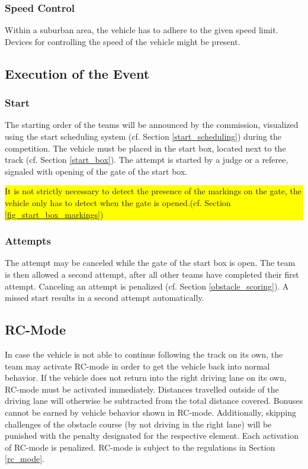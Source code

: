 \documentclass[a4paper]{report}
\newlength\colorboxwidth
\begin{document}
{\subsubsection{Speed Control}

Within a suburban area, the vehicle has to adhere to the given speed limit. Devices for controlling the speed of the vehicle might be present. 

\subsection{Execution of the Event}

\subsubsection{Start}

The starting order of the teams will be announced by the commission, visualized using the start scheduling system (cf. Section \ref{start_scheduling}) during the competition. The vehicle must be placed in the start box, located next to the track (cf. Section \ref{start_box}). The attempt is started by a judge or a referee, signaled with opening of the gate of the start box.\\
{\colorbox{yellow}{\parbox{\colorboxwidth}{It is not strictly necessary to detect the presence of the markings on the gate, the vehicle only has to detect when the gate is opened.(cf. Section \ref{fig_start_box_markings})}}


\subsubsection{Attempts}

The attempt may be canceled while the gate of the start box is open. The team is then allowed a second attempt, after all other teams have completed their first attempt. Canceling an attempt is penalized (cf. Section \ref{obstacle_scoring}). A missed start results in a second attempt automatically. 

\subsection{RC-Mode}

In case the vehicle is not able to continue following the track on its own, the team may activate RC-mode in order to get the vehicle back into normal behavior. If the vehicle does not return into the right driving lane on its own, RC-mode must be activated immediately. Distances travelled outside of the driving lane will otherwise be subtracted from the total distance covered. Bonuses cannot be earned by vehicle behavior shown in RC-mode. Additionally, skipping challenges of the obstacle course (by not driving in the right lane) will be punished with the penalty designated for the respective element. Each activation of RC-mode is penalized. RC-mode is subject to the regulations in Section \ref{rc_mode}. 

}}
\end{document}
